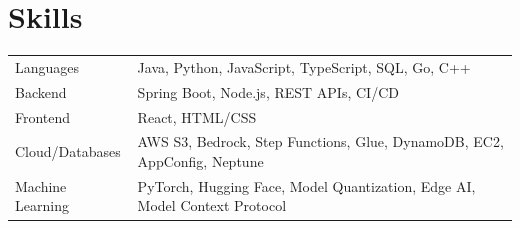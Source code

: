 \documentclass[a4paper,9pt]{article}
\begin{document}
\section{Skills}
\begin{tabularx}{\linewidth}{@{}l X@{}}
Languages & Java, Python, JavaScript, TypeScript, SQL, Go, C++ \\
Backend  & Spring Boot, Node.js, REST APIs, CI/CD \\
Frontend & React, HTML/CSS \\
Cloud/Databases & AWS S3, Bedrock, Step Functions, Glue, DynamoDB, EC2, AppConfig, Neptune \\
Machine Learning & PyTorch, Hugging Face, Model Quantization, Edge AI, Model Context Protocol \\
\end{tabularx}

\vfill
\end{document}
